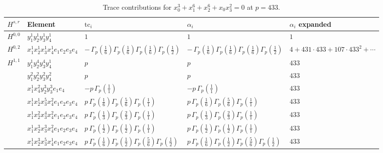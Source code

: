 \documentclass[11pt]{article}
\begin{document}
\begin{table}[ht]
\centering
\caption{Trace contributions for $x_0^{3} + x_1^{6} + x_2^{6} + x_0 x_3^{2} = 0$ at $p=433$.}\label{tab:deformed-6}
\renewcommand{\arraystretch}{1.1}
{\scriptsize
\begin{tabular}{@{}lllll@{}}
\toprule
$H^{s,r}$ & Element & $\mathrm{tc}_i$ & $\alpha_i$ & $\alpha_i$ expanded \\
\midrule
$H^{0,0}$ & $y_{1}^{1} y_{2}^{1} y_{3}^{1} y_{4}^{1}$ & $1$ & $1$ & $1$ \\
\midrule
$H^{0,2}$ & $x_{1}^{1} x_{2}^{1} x_{3}^{1} x_{4}^{1}  e_{1} e_{2} e_{3} e_{4}$ & $- \, \Gamma_p \left( \frac{1}{6} \right) \Gamma_p \left( \frac{1}{6} \right) \Gamma_p \left( \frac{1}{6} \right) \Gamma_p \left( \frac{1}{2} \right)$ & $- \, \Gamma_p \left( \frac{1}{6} \right) \Gamma_p \left( \frac{1}{6} \right) \Gamma_p \left( \frac{1}{6} \right) \Gamma_p \left( \frac{1}{2} \right)$ & $4{+}431{\cdot}433{+}107{\cdot}433^{2}{+}\cdots$ \\
\midrule
$H^{1,1}$ & $y_{1}^{1} y_{2}^{4} y_{3}^{4} y_{4}^{1}$ & $p \,$ & $p \,$ & $433$ \\
 & $y_{1}^{2} y_{2}^{2} y_{3}^{2} y_{4}^{2}$ & $p \,$ & $p \,$ & $433$ \\
 & $x_{1}^{1} x_{4}^{2} y_{2}^{3} y_{3}^{3} e_{1} e_{4}$ & $- p \, \Gamma_p \left( \frac{1}{1} \right)$ & $- p \, \Gamma_p \left( \frac{1}{1} \right)$ & $433$ \\
 & $x_{1}^{1} x_{2}^{1} x_{3}^{5} x_{4}^{2}  e_{1} e_{2} e_{3} e_{4}$ & $p \, \Gamma_p \left( \frac{1}{6} \right) \Gamma_p \left( \frac{5}{6} \right) \Gamma_p \left( \frac{1}{1} \right)$ & $p \, \Gamma_p \left( \frac{1}{6} \right) \Gamma_p \left( \frac{5}{6} \right) \Gamma_p \left( \frac{1}{1} \right)$ & $433$ \\
 & $x_{1}^{1} x_{2}^{2} x_{3}^{4} x_{4}^{2}  e_{1} e_{2} e_{3} e_{4}$ & $p \, \Gamma_p \left( \frac{1}{3} \right) \Gamma_p \left( \frac{2}{3} \right) \Gamma_p \left( \frac{1}{1} \right)$ & $p \, \Gamma_p \left( \frac{1}{3} \right) \Gamma_p \left( \frac{2}{3} \right) \Gamma_p \left( \frac{1}{1} \right)$ & $433$ \\
 & $x_{1}^{1} x_{2}^{3} x_{3}^{3} x_{4}^{2}  e_{1} e_{2} e_{3} e_{4}$ & $p \, \Gamma_p \left( \frac{1}{2} \right) \Gamma_p \left( \frac{1}{2} \right) \Gamma_p \left( \frac{1}{1} \right)$ & $p \, \Gamma_p \left( \frac{1}{2} \right) \Gamma_p \left( \frac{1}{2} \right) \Gamma_p \left( \frac{1}{1} \right)$ & $433$ \\
 & $x_{1}^{1} x_{2}^{3} x_{3}^{5} x_{4}^{1}  e_{1} e_{2} e_{3} e_{4}$ & $p \, \Gamma_p \left( \frac{1}{6} \right) \Gamma_p \left( \frac{1}{2} \right) \Gamma_p \left( \frac{5}{6} \right) \Gamma_p \left( \frac{1}{2} \right)$ & $p \, \Gamma_p \left( \frac{1}{6} \right) \Gamma_p \left( \frac{1}{2} \right) \Gamma_p \left( \frac{5}{6} \right) \Gamma_p \left( \frac{1}{2} \right)$ & $433$ \\

\end{tabular}}
\end{table}
\end{document}

